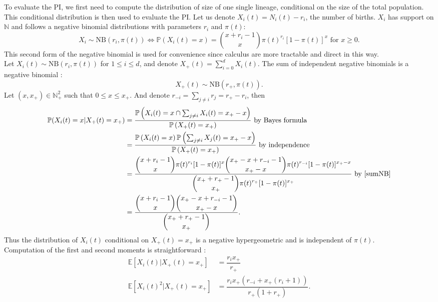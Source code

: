 \documentclass{article}
\newcommand{\pr}{{\mathbb{P}}}
\begin{document}
 
 
  To evaluate the PI, we first need to compute the distribution of size of one single lineage, conditional on the size of the total population. This conditional distribution is then used to evaluate the PI.
 Let us denote $X_i(t)=N_i(t)-r_i$, the number of births. $X_i$ has support on $\mathbb{N}$ and follows a negative binomial distributions with parameters $r_i$ and $\pi(t)$:
\begin{equation}
X_i \sim \mathrm{NB}(r_i,\pi(t)) \iff \pr(X_i(t)=x)=\binom{x+r_i-1}{x} \pi(t)^{r_i} [1-\pi(t)]^{x} \text{ for } x \geq 0.
\end{equation}
This second form of the negative binomial is used for convenience since calculus are more tractable and direct in this way.\\
Let $X_i(t) \sim \mathrm{NB}(r_i,\pi(t))$ for $1 \leq i \leq d$, and denote $X_+(t)=\sum_{i=0}^d X_i(t)$. The sum of independent negative binomials is a negative binomial \cite{johnson2005univariate}:
\begin{equation}
 X_+(t)  \sim \mathrm{NB} \left( r_+, \pi(t) \right). \label{sumNB}
\end{equation}
Let $(x,x_+) \in \mathbb{N}_+^2$ such that $0 \leq x \leq x_+$. And denote $ \displaystyle r_{-i}=\sum_{j \neq i} r_j=r_+-r_i$, then
\begin{align}
\pr( X_i(t)=x \vert X_+(t)=x_+ ) &=\dfrac{\pr\left( X_i(t)=x \cap \sum_{j \neq i} X_i(t)=x_+-x \right)}{\pr\left(X_+(t)=x_+\right)} \text{ by Bayes formula}\\
 &=\dfrac{\pr\left(X_i(t)=x\right) \pr\left(\sum_{j \neq i} X_j(t)=x_+-x\right)}{\pr\left(X_+(t)=x_+\right)} \text{ by independence}\\
 &=\dfrac{\displaystyle \binom{x+r_i-1}{x} \pi(t)^{r_i} [1-\pi(t)]^{x} \binom{x_+-x+r_{-i}-1}{x_+-x} \pi(t)^{r_{-i}} [1-\pi(t)]^{x_+-x} }{\displaystyle \binom{x_++r_+ -1}{x_+} \pi(t)^{r_+ } [1-\pi(t)]^{x_+}} \text{ by }\eqref{sumNB} \\
 &=\dfrac{\displaystyle \binom{x+r_i-1}{x} \binom{x_+-x+r_{-i}-1}{x_+-x}}{\displaystyle \binom{x_+ +r_+ -1}{x_+}}.
\end{align}
Thus the distribution of $X_i(t)$ conditional on $ X_+(t)=x_+$ is a negative hypergeometric and is independent of $\pi(t)$.\\
Computation of the first and second moments is straightforward \cite[p. 262]{johnson2005univariate}: 
\begin{align}
\mathbb{E} [ X_i(t) \vert X_+(t)=x_+ ] &=\dfrac{r_i x_+}{r_+ } \\
\mathbb{E} [ X_i(t)^2 \vert X_+(t)=x_+ ] &=\dfrac{r_i x_+ (r_{-i} +x_+ (r_i+1))}{r_+ (1+r_+ )}.
\end{align}
\end{document}
